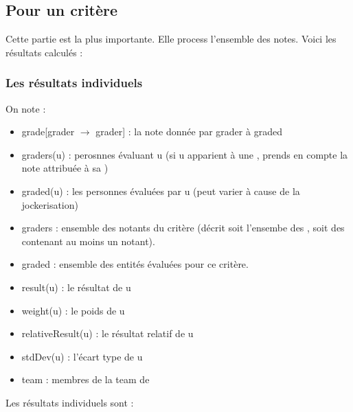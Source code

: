 \subsection{Pour un critère}
        Cette partie est la plus importante. Elle process l'ensemble des notes. Voici les résultats calculés : 
        \subsubsection{Les résultats individuels}
            On note : 
            \begin{itemize}
                \item[\BB] grade[grader $\rightarrow$ grader] : la note donnée par grader à graded
                \item[\BB] graders(u) : perosnnes évaluant u (si u apparient à une \te, prends en compte la note attribuée à sa \te)
                \item[\BB] graded(u) : les personnes évaluées par u (peut varier à cause de la jockerisation)
                \item[\BB] graders : ensemble des notants du critère (décrit soit l'ensembe des \usr, soit des \te{} contenant au moins un \usr{} notant).
                \item[\BB] graded : ensemble des entités évaluées pour ce critère.
                \item[\BB] result(u) : le résultat de u
                \item[\BB] weight(u) : le poids de u
                \item[\BB] relativeResult(u) : le résultat relatif de u
                \item[\BB] stdDev(u) : l'écart type de u
                \item[\BB] team : membres de la team de 
            \end{itemize}  
            Les résultats individuels sont :   
